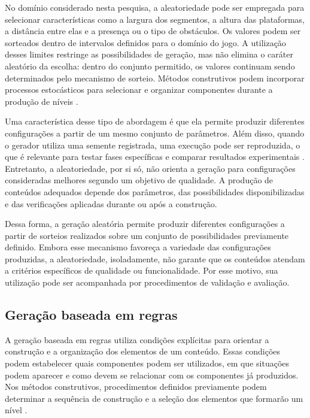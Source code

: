 No domínio considerado nesta pesquisa, a aleatoriedade
pode ser empregada para selecionar características
como a largura dos segmentos, a altura das plataformas,
a distância entre elas e a presença ou o tipo de
obstáculos. Os valores podem ser sorteados dentro de
intervalos definidos para o domínio do jogo. A utilização
desses limites restringe as possibilidades de geração,
mas não elimina o caráter aleatório da escolha: dentro
do conjunto permitido, os valores continuam sendo
determinados pelo mecanismo de sorteio. Métodos
construtivos podem incorporar processos estocásticos
para selecionar e organizar componentes durante a
produção de níveis \cite{ShakerConstructive2016}.

Uma característica desse tipo de abordagem é que
ela permite produzir diferentes configurações a partir
de um mesmo conjunto de parâmetros. Além disso, quando
o gerador utiliza uma semente registrada, uma execução
pode ser reproduzida, o que é relevante para testar
fases específicas e comparar resultados experimentais
\cite{MalekiZhao2024}. Entretanto, a aleatoriedade,
por si só, não orienta a geração para configurações
consideradas melhores segundo um objetivo de qualidade.
A produção de conteúdos adequados depende dos parâmetros,
das possibilidades disponibilizadas e das verificações
aplicadas durante ou após a construção.

Dessa forma, a geração aleatória permite produzir diferentes configurações 
a partir de sorteios realizados sobre um conjunto de possibilidades 
previamente definido. Embora esse mecanismo favoreça a variedade das 
configurações produzidas, a aleatoriedade, isoladamente, não garante que 
os conteúdos atendam a critérios específicos de qualidade ou 
funcionalidade. Por esse motivo, sua utilização pode ser acompanhada por 
procedimentos de validação e avaliação.

\subsection{Geração baseada em regras}

A geração baseada em regras utiliza condições explícitas
para orientar a construção e a organização dos elementos
de um conteúdo. Essas condições podem estabelecer quais
componentes podem ser utilizados, em que situações
podem aparecer e como devem se relacionar com os
componentes já produzidos. Nos métodos construtivos,
procedimentos definidos previamente podem determinar
a sequência de construção e a seleção dos elementos
que formarão um nível \cite{ShakerConstructive2016}.

